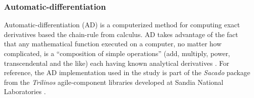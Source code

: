 \documentclass[preprint,12pt]{elsarticle}
\begin{document}
\subsubsection{Automatic-differentiation} 
\label{ADsubsection}

Automatic-differentiation (AD) is a computerized method for computing exact
derivatives based the chain-rule from calculus. AD takes advantage of the fact
that any mathematical function executed on a computer, no matter how
complicated, is a ``composition of simple operations'' (add, multiply, power,
transcendental and the like) each having known analytical derivatives
\cite{ref-sacado-presentation}. For reference, the AD implementation used in
the study is part of the \emph{Sacado} package from the \emph{Trilinos}
agile-component libraries developed at Sandia National Laboratories
\cite{ref-Sacado}.
\end{document}
